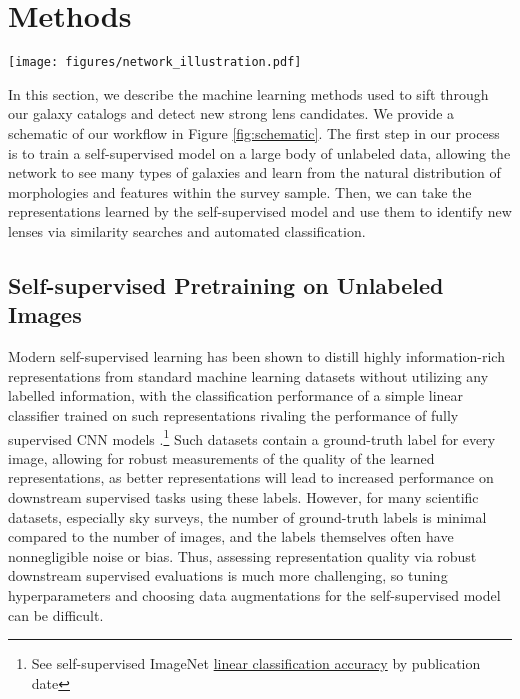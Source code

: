 \documentclass{aastex631}
\begin{document}
\section{Methods}
\label{sec:methods}

\begin{figure*}
    \centering
    \texttt{[image: figures/network\_illustration.pdf]}
    \caption{Illustration of self-supervised training (left; see \cite{Hayat_2021}) and its use cases for discovering objects through similarity search (middle) and automated classification (right).}
    \label{fig:schematic}
\end{figure*}

In this section, we describe the machine learning methods used to sift through our galaxy catalogs and detect new strong lens candidates. We provide a schematic of our workflow in Figure \ref{fig:schematic}. The first step in our process is to train a self-supervised model on a large body of unlabeled data, allowing the network to see many types of galaxies and learn from the natural distribution of morphologies and features within the survey sample. Then, we can take the representations learned by the self-supervised model and use them to identify new lenses via similarity searches and automated classification.

\subsection{Self-supervised Pretraining on Unlabeled Images}

Modern self-supervised learning has been shown to distill highly information-rich representations from standard machine learning datasets without utilizing any labelled information, with the classification performance of a simple linear classifier trained on such representations rivaling the performance of fully supervised CNN models \citep{chen2020simple, he2020momentum,  BYOL}.\footnote{See self-supervised ImageNet  \href{https://paperswithcode.com/sota/self-supervised-image-classification-on}{linear classification accuracy} by publication date} Such datasets contain a ground-truth label for every image, allowing for robust measurements of the quality of the learned representations, as better representations will lead to increased performance on downstream supervised tasks using these labels. However, for many scientific datasets, especially sky surveys, the number of ground-truth labels is minimal compared to the number of images, and the labels themselves often have nonnegligible noise or bias. Thus, assessing representation quality via robust downstream supervised evaluations is much more challenging, so tuning hyperparameters and choosing data augmentations for the self-supervised model can be difficult.
\end{document}
